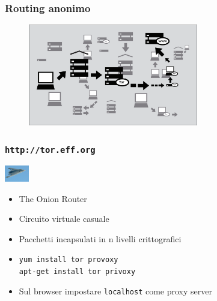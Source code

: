 \documentclass[xcolor=svgnames,handout]{beamer}
\begin{document}
\begin{frame}
	\frametitle{Routing anonimo}

	\begin{figure}[+ht]
			\begin{center}
					\includegraphics[width=280px]{img/tor.png}
			\end{center}
	\end{figure}

\end{frame}

\begin{frame}
	\frametitle{\texttt{http://tor.eff.org}}

	\begin{block}{\includegraphics[width=40px]{img/stealth.jpg}}
			\begin{itemize}
					\item The Onion Router
						\pause
					\item Circuito virtuale casuale
						\pause
					\item Pacchetti incapsulati in n livelli crittografici
						\pause
					\item \texttt{yum install tor provoxy} \\
						  \texttt{apt-get install tor privoxy}
						\pause
					\item Sul browser impostare \texttt{localhost} come proxy server
			\end{itemize}
	\end{block}
						
\end{frame}
\end{document}
